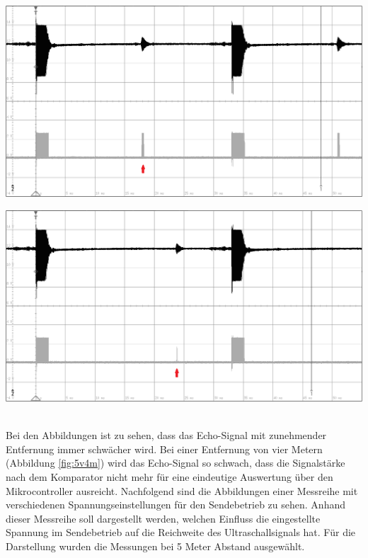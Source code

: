 \begin{minipage}{0.46\textwidth}
\includegraphics[width=1\textwidth%
]{Abbildungen/MessungenP2/5V/3mb.PNG}
\label{fig:5v3m}
\end{minipage}\qquad
\begin{minipage}{0.46\textwidth}
\includegraphics[width=1\textwidth%
]{Abbildungen/MessungenP2/5V/4mb.PNG}
\label{fig:5v4m}
\end{minipage}\\
Bei den Abbildungen ist zu sehen, dass das Echo-Signal mit zunehmender Entfernung immer schwächer wird. Bei einer Entfernung von vier Metern (Abbildung \ref{fig:5v4m}) wird das Echo-Signal so schwach, dass die Signalstärke nach dem Komparator nicht mehr für eine eindeutige Auswertung über den Mikrocontroller ausreicht. Nachfolgend sind die Abbildungen einer Messreihe mit verschiedenen Spannungseinstellungen für den Sendebetrieb zu sehen. Anhand dieser Messreihe soll dargestellt werden, welchen Einfluss die eingestellte Spannung im Sendebetrieb auf die Reichweite des Ultraschallsignals hat. Für die Darstellung wurden die Messungen bei 5 Meter Abstand ausgewählt.\\
